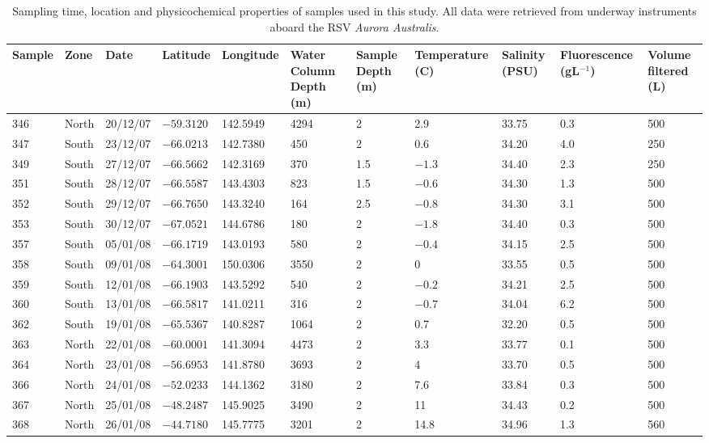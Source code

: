 \begin{sidewaystable}
\sffamily
\caption[Details of samples used in Polar Front study]{\sffamily{}Sampling time, location and physicochemical properties of samples used in this study.
All data were retrieved from underway instruments aboard the RSV \textit{Aurora Australis}.}
\label{tab:samplelist}
\smallskip
\begin{tabularx}{\textheight}{lllllXXXXXX}
\toprule
\textbf{Sample} & \textbf{Zone} & \textbf{Date} & \textbf{Latitude} & \textbf{Longitude} & \textbf{Water \linebreak Column \linebreak Depth (m)} & \textbf{Sample Depth (m)} & \textbf{Temperature (\textdegree{}C)} & \textbf{Salinity (PSU)} & \textbf{Fluorescence \linebreak (\textmu{}gL$^{-1}$)} & \textbf{Volume \linebreak filtered (L)}\\
\midrule

346 & North & 20/12/07 & $-59.3120$ & 142.5949 & 4294 & 2 & 2.9 & 33.75 & 0.3 & 500\\
347 & South & 23/12/07 & $-66.0213$ & 142.7380 & 450 & 2 & 0.6 & 34.20 & 4.0 & 250\\
349 & South & 27/12/07 & $-66.5662$ & 142.3169 & 370 & 1.5 & $-1.3$ & 34.40 & 2.3 & 250\\
351 & South & 28/12/07 & $-66.5587$ & 143.4303 & 823 & 1.5 & $-0.6$ & 34.30 & 1.3 & 500\\
352 & South & 29/12/07 & $-66.7650$ & 143.3240 & 164 & 2.5 & $-0.8$ & 34.30 & 3.1 & 500\\
353 & South & 30/12/07 & $-67.0521$ & 144.6786 & 180 & 2 & $-1.8$ & 34.40 & 0.3 & 500\\
357 & South & 05/01/08 & $-66.1719$ & 143.0193 & 580 & 2 & $-0.4$ & 34.15 & 2.5 & 500\\
358 & South & 09/01/08 & $-64.3001$ & 150.0306 & 3550 & 2 & 0 & 33.55 & 0.5 & 500\\
359 & South & 12/01/08 & $-66.1903$ & 143.5292 & 540 & 2 & $-0.2$ & 34.21 & 2.5 & 500\\
360 & South & 13/01/08 & $-66.5817$ & 141.0211 & 316 & 2 & $-0.7$ & 34.04 & 6.2 & 500\\
362 & South & 19/01/08 & $-65.5367$ & 140.8287 & 1064 & 2 & 0.7 & 32.20 & 0.5 & 500\\
363 & North & 22/01/08 & $-60.0001$ & 141.3094 & 4473 & 2 & 3.3 & 33.77 & 0.1 & 500\\
364 & North & 23/01/08 & $-56.6953$ & 141.8780 & 3693 & 2 & 4 & 33.70 & 0.5 & 500\\
366 & North & 24/01/08 & $-52.0233$ & 144.1362 & 3180 & 2 & 7.6 & 33.84 & 0.3 & 500\\
367 & North & 25/01/08 & $-48.2487$ & 145.9025 & 3490 & 2 & 11 & 34.43 & 0.2 & 500\\
368 & North & 26/01/08 & $-44.7180$ & 145.7775 & 3201 & 2 & 14.8 & 34.96 & 1.3 & 560\\

\bottomrule
\end{tabularx}
\end{sidewaystable}
